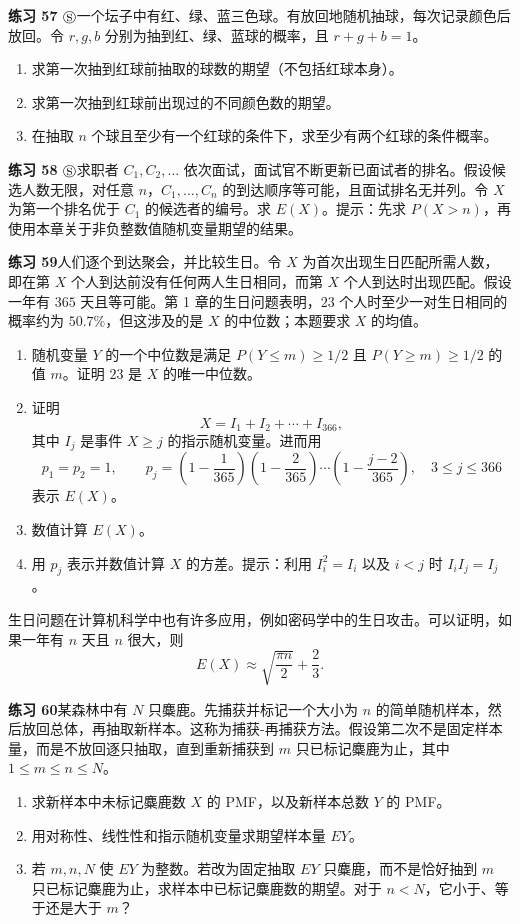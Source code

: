 \documentclass[UTF8, 12pt, fontset=fandol, oneside]{ctexart}
\begin{document}
\noindent\textbf{练习 57 $\circledS$}\quad 一个坛子中有红、绿、蓝三色球。有放回地随机抽球，每次记录颜色后放回。令 $r,g,b$ 分别为抽到红、绿、蓝球的概率，且 $r+g+b=1$。
\begin{enumerate}
  \item[(a)] 求第一次抽到红球前抽取的球数的期望（不包括红球本身）。
  \item[(b)] 求第一次抽到红球前出现过的不同颜色数的期望。
  \item[(c)] 在抽取 $n$ 个球且至少有一个红球的条件下，求至少有两个红球的条件概率。
\end{enumerate}

\noindent\textbf{练习 58 $\circledS$}\quad 求职者 $C_1,C_2,\ldots$ 依次面试，面试官不断更新已面试者的排名。假设候选人数无限，对任意 $n$，$C_1,\ldots,C_n$ 的到达顺序等可能，且面试排名无并列。令 $X$ 为第一个排名优于 $C_1$ 的候选者的编号。求 $E(X)$。提示：先求 $P(X>n)$，再使用本章关于非负整数值随机变量期望的结果。

\noindent\textbf{练习 59}\quad 人们逐个到达聚会，并比较生日。令 $X$ 为首次出现生日匹配所需人数，即在第 $X$ 个人到达前没有任何两人生日相同，而第 $X$ 个人到达时出现匹配。假设一年有 $365$ 天且等可能。第 1 章的生日问题表明，$23$ 个人时至少一对生日相同的概率约为 $50.7\%$，但这涉及的是 $X$ 的中位数；本题要求 $X$ 的均值。
\begin{enumerate}
  \item[(a)] 随机变量 $Y$ 的一个中位数是满足 $P(Y\le m)\ge 1/2$ 且 $P(Y\ge m)\ge 1/2$ 的值 $m$。证明 $23$ 是 $X$ 的唯一中位数。
  \item[(b)] 证明
  \[
    X=I_1+I_2+\cdots+I_{366},
  \]
  其中 $I_j$ 是事件 $X\ge j$ 的指示随机变量。进而用
  \[
    p_1=p_2=1,\qquad
    p_j=\left(1-\frac{1}{365}\right)\left(1-\frac{2}{365}\right)\cdots
    \left(1-\frac{j-2}{365}\right),\quad 3\le j\le 366
  \]
  表示 $E(X)$。
  \item[(c)] 数值计算 $E(X)$。
  \item[(d)] 用 $p_j$ 表示并数值计算 $X$ 的方差。提示：利用 $I_i^2=I_i$ 以及 $i<j$ 时 $I_iI_j=I_j$。
\end{enumerate}
生日问题在计算机科学中也有许多应用，例如密码学中的生日攻击。可以证明，如果一年有 $n$ 天且 $n$ 很大，则
\[
  E(X)\approx \sqrt{\frac{\pi n}{2}}+\frac{2}{3}.
\]

\noindent\textbf{练习 60}\quad 某森林中有 $N$ 只麋鹿。先捕获并标记一个大小为 $n$ 的简单随机样本，然后放回总体，再抽取新样本。这称为捕获-再捕获方法。假设第二次不是固定样本量，而是不放回逐只抽取，直到重新捕获到 $m$ 只已标记麋鹿为止，其中 $1\le m\le n\le N$。
\begin{enumerate}
  \item[(a)] 求新样本中未标记麋鹿数 $X$ 的 PMF，以及新样本总数 $Y$ 的 PMF。
  \item[(b)] 用对称性、线性性和指示随机变量求期望样本量 $EY$。
  \item[(c)] 若 $m,n,N$ 使 $EY$ 为整数。若改为固定抽取 $EY$ 只麋鹿，而不是恰好抽到 $m$ 只已标记麋鹿为止，求样本中已标记麋鹿数的期望。对于 $n<N$，它小于、等于还是大于 $m$？
\end{enumerate}
\end{document}
